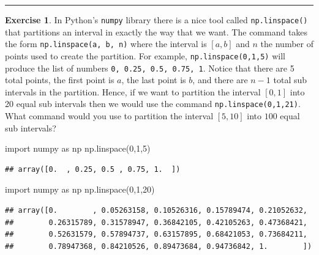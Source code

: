 \documentclass[
]{book}
\newenvironment{Shaded}{\begin{snugshade}}{\end{snugshade}}
\newcommand{\DecValTok}[1]{\textcolor[rgb]{0.00,0.00,0.81}{#1}}
\newcommand{\ImportTok}[1]{#1}
\newcommand{\NormalTok}[1]{#1}
\theoremstyle{definition}
\theoremstyle{definition}
\theoremstyle{definition}
\newtheorem{exercise}{Exercise}[chapter]
\theoremstyle{remark}
\begin{document}
\begin{center}\rule{0.5\linewidth}{0.5pt}\end{center}

\begin{exercise}
\protect\hypertarget{exr:unnamed-chunk-139}{}{\label{exr:unnamed-chunk-139} }In Python's \texttt{numpy} library there is a nice tool called \texttt{np.linspace()} that partitions an interval in exactly the way that we want. The command takes the form \texttt{np.linspace(a,\ b,\ n)} where the interval is \([a,b]\) and \(n\) the number of points used to create the partition. For example, \texttt{np.linspace(0,1,5)} will produce the list of numbers \texttt{0,\ 0.25,\ 0.5,\ 0.75,\ 1}. Notice that there are 5 total points, the first point is \(a\), the last point is \(b\), and there are \(n-1\) total sub intervals in the partition. Hence, if we want to partition the interval \([0,1]\) into 20 equal sub intervals then we would use the command \texttt{np.linspace(0,1,21)}. What command would you use to partition the interval \([5,10]\) into \(100\) equal sub intervals?
\end{exercise}

\begin{Shaded}
\begin{Highlighting}[]
\ImportTok{import}\NormalTok{ numpy }\ImportTok{as}\NormalTok{ np}
\NormalTok{np.linspace(}\DecValTok{0}\NormalTok{,}\DecValTok{1}\NormalTok{,}\DecValTok{5}\NormalTok{)}
\end{Highlighting}
\end{Shaded}

\begin{verbatim}
## array([0.  , 0.25, 0.5 , 0.75, 1.  ])
\end{verbatim}

\begin{Shaded}
\begin{Highlighting}[]
\ImportTok{import}\NormalTok{ numpy }\ImportTok{as}\NormalTok{ np}
\NormalTok{np.linspace(}\DecValTok{0}\NormalTok{,}\DecValTok{1}\NormalTok{,}\DecValTok{20}\NormalTok{)}
\end{Highlighting}
\end{Shaded}

\begin{verbatim}
## array([0.        , 0.05263158, 0.10526316, 0.15789474, 0.21052632,
##        0.26315789, 0.31578947, 0.36842105, 0.42105263, 0.47368421,
##        0.52631579, 0.57894737, 0.63157895, 0.68421053, 0.73684211,
##        0.78947368, 0.84210526, 0.89473684, 0.94736842, 1.        ])
\end{verbatim}
\end{document}
